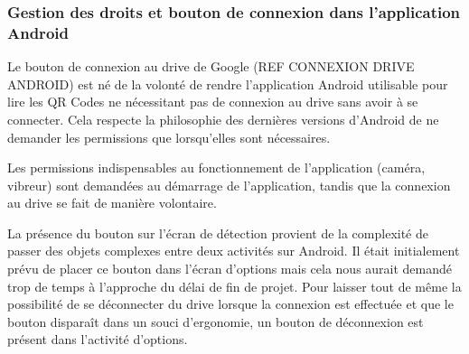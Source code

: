 \subsubsection{Gestion des droits et bouton de connexion dans l'application Android}
\par
Le bouton de connexion au drive de Google (REF CONNEXION DRIVE ANDROID) est né de la volonté de rendre l'application Android utilisable pour lire les QR Codes ne nécessitant pas de connexion au drive sans avoir à se connecter. Cela respecte la philosophie des dernières versions d'Android de ne demander les permissions que lorsqu'elles sont nécessaires.
\par
Les permissions indispensables au fonctionnement de l'application (caméra, vibreur) sont demandées au démarrage de l'application, tandis que la connexion au drive se fait de manière volontaire.
\par
La présence du bouton sur l'écran de détection provient de la complexité de passer des objets complexes entre deux activités sur Android. Il était initialement prévu de placer ce bouton dans l'écran d'options mais cela nous aurait demandé trop de temps à l'approche du délai de fin de projet. Pour laisser tout de même la possibilité de se déconnecter du drive lorsque la connexion est effectuée et que le bouton disparaît dans un souci d'ergonomie, un bouton de déconnexion est présent dans l'activité d'options.
